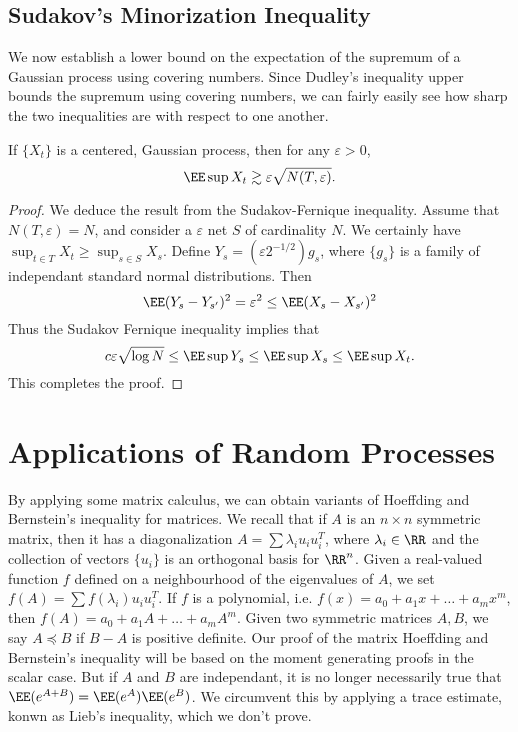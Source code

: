 \section{Sudakov's Minorization Inequality}

We now establish a lower bound on the expectation of the supremum of a Gaussian process using covering numbers. Since Dudley's inequality upper bounds the supremum using covering numbers, we can fairly easily see how sharp the two inequalities are with respect to one another.

\begin{theorem}
	If $\{ X_t \}$ is a centered, Gaussian process, then for any $\varepsilon > 0$,
	\[ \EE \sup X_t \gtrsim \varepsilon \sqrt{N(T,\varepsilon)}. \]
\end{theorem}
\begin{proof}
	We deduce the result from the Sudakov-Fernique inequality. Assume that $N(T,\varepsilon) = N$, and consider a $\varepsilon$ net $S$ of cardinality $N$. We certainly have $\sup_{t \in T} X_t \geq \sup_{s \in S} X_s$. Define $Y_s = (\varepsilon 2^{-1/2}) g_s$, where $\{ g_s \}$ is a family of independant standard normal distributions. Then
	\[ \EE (Y_s - Y_{s'})^2 = \varepsilon^2 \leq \EE (X_s - X_{s'})^2 \]
	Thus the Sudakov Fernique inequality implies that
	\[ c \varepsilon \sqrt{\log N} \leq \EE \sup Y_s \leq \EE \sup X_s \leq \EE \sup X_t. \]
	This completes the proof.
\end{proof}

\chapter{Applications of Random Processes}

By applying some matrix calculus, we can obtain variants of Hoeffding and Bernstein's inequality for matrices. We recall that if $A$ is an $n \times n$ symmetric matrix, then it has a diagonalization $A = \sum \lambda_i u_i u_i^T$, where $\lambda_i \in \RR$ and the collection of vectors $\{ u_i \}$ is an orthogonal basis for $\RR^n$. Given a real-valued function $f$ defined on a neighbourhood of the eigenvalues of $A$, we set $f(A) = \sum f(\lambda_i) u_i u_i^T$. If $f$ is a polynomial, i.e. $f(x) = a_0 + a_1x + \dots + a_m x^m$, then $f(A) = a_0 + a_1A + \dots + a_m A^m$. Given two symmetric matrices $A,B$, we say $A \preceq B$ if $B - A$ is positive definite. Our proof of the matrix Hoeffding and Bernstein's inequality will be based on the moment generating proofs in the scalar case. But if $A$ and $B$ are independant, it is no longer necessarily true that $\EE(e^{A+B}) = \EE(e^A) \EE(e^B)$. We circumvent this by applying a trace estimate, konwn as Lieb's inequality, which we don't prove.

